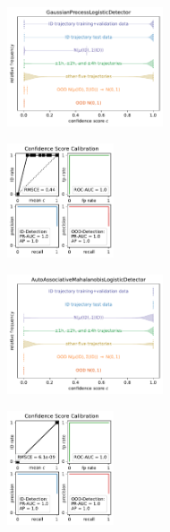 \begin{figure}[H]
    \centering
    \begin{subfigure}
        \centering
        \includegraphics[width=0.505\textwidth,valign=t]{ood-detection/figures/confidence-score/ood.gaussianprocesslogisticdetector-distribution.pdf}
    \end{subfigure}
    \begin{subfigure}
        \centering
        \includegraphics[width=0.345\textwidth,valign=t]{ood-detection/figures/confidence-score/ood.gaussianprocesslogisticdetector-calibration.pdf}
    \end{subfigure}

    \begin{subfigure}
        \centering
        \includegraphics[width=0.505\textwidth,valign=t]{ood-detection/figures/confidence-score/ood.autoassociativemahalanobislogisticdetector-distribution.pdf}
    \end{subfigure}
    \begin{subfigure}
        \centering
        \includegraphics[width=0.345\textwidth,valign=t]{ood-detection/figures/confidence-score/ood.autoassociativemahalanobislogisticdetector-calibration.pdf}
    \end{subfigure}


\end{figure}
